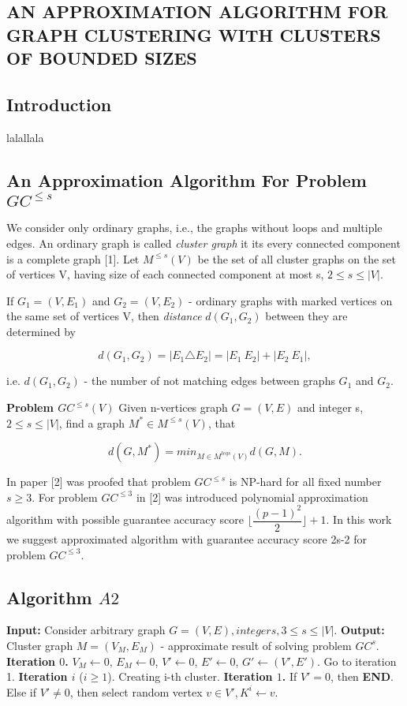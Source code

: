 \documentclass[12pt]{article}
\begin{document}
\begin{center}
	\section*{AN APPROXIMATION ALGORITHM FOR GRAPH CLUSTERING WITH CLUSTERS OF BOUNDED SIZES}
	\subsection*{Introduction}
\end{center}

lalallala

	\subsection*{An Approximation Algorithm For Problem $GC^{ \leq s} $}


We consider only ordinary graphs, i.e., the graphs without loops and multiple edges. An ordinary graph is called \textit{cluster graph} it its every connected component is a complete graph [1].
Let $M^{\leq s}(V)$ be the set of all cluster graphs on the set of vertices V, having size of each connected component at most s, $ 2 \leq s \leq |V|$.

If $G_1 = (V,E_1)$ and $G_2 = (V, E_2)$ - ordinary graphs with marked vertices on the same set of vertices V, then \textit{distance} $d(G_1,G_2)$ between they are determined by

$$
d(G_1,G_2) = |E_1\triangle E_2| = |E_1 \ E_2| + |E_2\ E_1|,
$$

i.e. $d(G_1,G_2)$ - the number of not matching edges between graphs $G_1$ and $G_2$.

\textbf{Problem $GC^{\leq s}(V)$} Given n-vertices  graph $G = (V,E)$ and integer s,  $2 \leq s \leq |V|$, find a graph $M^* \in M^{\leq s}(V)$, that

$$
d(G,M^*)= min_{M\in M^{leq s}(V)}d(G,M).
$$

In paper [2] was proofed that problem $GC^{\leq s}$ is NP-hard for all fixed number $s \geq 3$. For problem $GC^{\leq 3}$ in [2] was introduced polynomial approximation algorithm  with possible guarantee accuracy score
$ \lfloor \dfrac{(p-1)^2}{2} \rfloor + 1$. In this work we suggest approximated algorithm with guarantee accuracy score 2s-2 for problem $GC^{\leq 3}$. %


	\subsection*{Algorithm $A2$}
\textbf{Input:} Consider arbitrary graph $ G = (V,E), integer s, 3 \leq s \leq |V|$.
\textbf{Output:} Cluster graph $M = (V_M,E_M)$ - approximate result of solving problem $GC^{s}$.
\textbf{Iteration $0$.} $V_M \leftarrow 0$, $E_M \leftarrow 0$, $V' \leftarrow 0$, $E' \leftarrow 0$, $G' \leftarrow (V',E')$. Go to iteration 1.
\textbf{Iteration $i$} ($i \geq 1 $). Creating i-th cluster.
\textbf{Iteration $1$.} If $V'=0$, then \textbf{END}.
Else if $V' \neq 0$, then select random vertex  $v\in V', K^i \leftarrow {v}$.
\end{document}
